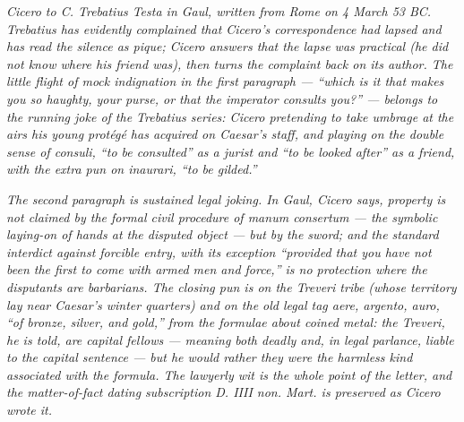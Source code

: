 
\textit{Cicero to C. Trebatius Testa in Gaul, written from Rome on
4 March 53 BC. Trebatius has evidently complained that Cicero's
correspondence had lapsed and has read the silence as pique;
Cicero answers that the lapse was practical (he did not know
where his friend was), then turns the complaint back on its
author. The little flight of mock indignation in the first
paragraph --- ``which is it that makes you so haughty, your purse,
or that the imperator consults you?'' --- belongs to the running
joke of the Trebatius series: Cicero pretending to take umbrage
at the airs his young protégé has acquired on Caesar's staff, and
playing on the double sense of \textit{consuli}, ``to be consulted''
as a jurist and ``to be looked after'' as a friend, with the
extra pun on \textit{inaurari}, ``to be gilded.''}

\textit{The second paragraph is sustained legal joking. In Gaul,
Cicero says, property is not claimed by the formal civil
procedure of \textit{manum consertum} --- the symbolic laying-on of
hands at the disputed object --- but by the sword; and the standard
interdict against forcible entry, with its exception ``provided
that you have not been the first to come with armed men and
force,'' is no protection where the disputants are barbarians.
The closing pun is on the Treveri tribe (whose territory lay near
Caesar's winter quarters) and on the old legal tag \textit{aere,
argento, auro}, ``of bronze, silver, and gold,'' from the formulae
about coined metal: the Treveri, he is told, are \textit{capital}
fellows --- meaning both deadly and, in legal parlance, liable to
the capital sentence --- but he would rather they were the harmless
kind associated with the formula. The lawyerly wit is the whole
point of the letter, and the matter-of-fact dating subscription
\textit{D. IIII non. Mart.} is preserved as Cicero wrote it.}
